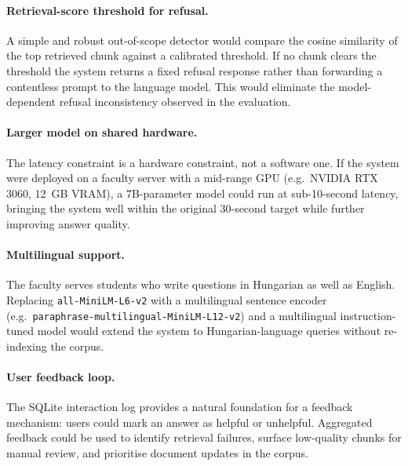 \paragraph{Retrieval-score threshold for refusal.}
A simple and robust out-of-scope detector would compare the cosine similarity of the top retrieved chunk against a calibrated threshold. If no chunk clears the threshold the system returns a fixed refusal response rather than forwarding a contentless prompt to the language model. This would eliminate the model-dependent refusal inconsistency observed in the evaluation.

\paragraph{Larger model on shared hardware.}
The latency constraint is a hardware constraint, not a software one. If the system were deployed on a faculty server with a mid-range GPU (e.g.\ NVIDIA RTX 3060, 12~GB VRAM), a 7B-parameter model could run at sub-10-second latency, bringing the system well within the original 30-second target while further improving answer quality.

\paragraph{Multilingual support.}
The faculty serves students who write questions in Hungarian as well as English. Replacing \texttt{all-MiniLM-L6-v2} with a multilingual sentence encoder (e.g.\ \texttt{paraphrase-multilingual-MiniLM-L12-v2}) and a multilingual instruction-tuned model would extend the system to Hungarian-language queries without re-indexing the corpus.

\paragraph{User feedback loop.}
The SQLite interaction log provides a natural foundation for a feedback mechanism: users could mark an answer as helpful or unhelpful. Aggregated feedback could be used to identify retrieval failures, surface low-quality chunks for manual review, and prioritise document updates in the corpus.
